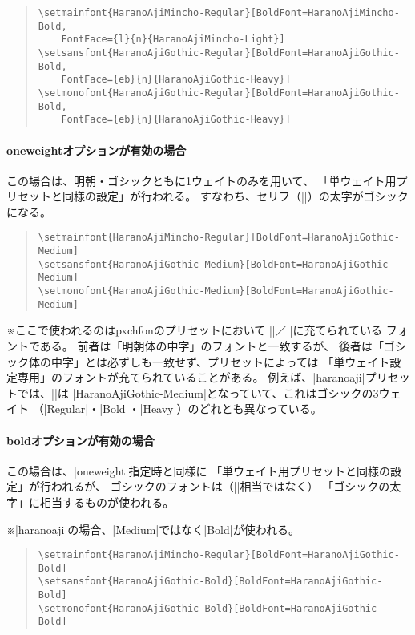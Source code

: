 \documentclass[xelatex,ja=standard,jafont=haranoaji,
  a4paper]{bxjsarticle}
\newcommand{\Pkg}[1]{\textsf{#1}}
\newcommand{\Note}{\par\noindent ※}
\newcommand{\JSl}{\mbox{／}\linebreak[0]}
\begin{document}
\begin{quote}\small\begin{verbatim}
\setmainfont{HaranoAjiMincho-Regular}[BoldFont=HaranoAjiMincho-Bold,
    FontFace={l}{n}{HaranoAjiMincho-Light}]
\setsansfont{HaranoAjiGothic-Regular}[BoldFont=HaranoAjiGothic-Bold,
    FontFace={eb}{n}{HaranoAjiGothic-Heavy}]
\setmonofont{HaranoAjiGothic-Regular}[BoldFont=HaranoAjiGothic-Bold,
    FontFace={eb}{n}{HaranoAjiGothic-Heavy}]
\end{verbatim}\end{quote}

\paragraph{oneweightオプションが有効の場合}
この場合は、明朝・ゴシックともに1ウェイトのみを用いて、
「単ウェイト用プリセットと同様の設定」が行われる。
すなわち、セリフ（|\rmfamily|）の太字がゴシックになる。

\begin{quote}\small\begin{verbatim}
\setmainfont{HaranoAjiMincho-Regular}[BoldFont=HaranoAjiGothic-Medium]
\setsansfont{HaranoAjiGothic-Medium}[BoldFont=HaranoAjiGothic-Medium]
\setmonofont{HaranoAjiGothic-Medium}[BoldFont=HaranoAjiGothic-Medium]
\end{verbatim}\end{quote}
\Note ここで使われるのは\Pkg{pxchfon}のプリセットにおいて%
|\setminchofont|\JSl|\setgothicfont|に充てられている
フォントである。
前者は「明朝体の中字」のフォントと一致するが、
後者は「ゴシック体の中字」とは必ずしも一致せず、プリセットによっては
「単ウェイト設定専用」のフォントが充てられていることがある。
例えば、|haranoaji|プリセットでは、|\setgothicfont|は%
|HaranoAjiGothic-Medium|となっていて、これはゴシックの3ウェイト%
（|Regular|・|Bold|・|Heavy|）のどれとも異なっている。

\paragraph{boldオプションが有効の場合}
この場合は、|oneweight|指定時と同様に
「単ウェイト用プリセットと同様の設定」が行われるが、
ゴシックのフォントは（|\setgothicfont|相当ではなく）
「ゴシックの太字」に相当するものが使われる。
\Note |haranoaji|の場合、|Medium|ではなく|Bold|が使われる。

\begin{quote}\small\begin{verbatim}
\setmainfont{HaranoAjiMincho-Regular}[BoldFont=HaranoAjiGothic-Bold]
\setsansfont{HaranoAjiGothic-Bold}[BoldFont=HaranoAjiGothic-Bold]
\setmonofont{HaranoAjiGothic-Bold}[BoldFont=HaranoAjiGothic-Bold]
\end{verbatim}\end{quote}
\end{document}
